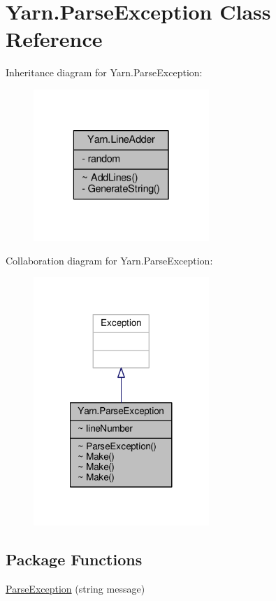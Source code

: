 \hypertarget{a00147}{\section{Yarn.\-Parse\-Exception Class Reference}
\label{a00147}
}


Inheritance diagram for Yarn.\-Parse\-Exception\-:
\nopagebreak
\begin{figure}[H]
\begin{center}
\leavevmode
\includegraphics[width=188pt]{a00712}
\end{center}
\end{figure}


Collaboration diagram for Yarn.\-Parse\-Exception\-:
\nopagebreak
\begin{figure}[H]
\begin{center}
\leavevmode
\includegraphics[width=188pt]{a00713}
\end{center}
\end{figure}
\subsection*{Package Functions}
\begin{DoxyCompactItemize}
\item 
\hyperlink{a00147_aa3c4f5c8b0ae86097bbc46044df9f317}{Parse\-Exception} (string message)
\end{DoxyCompactItemize}
